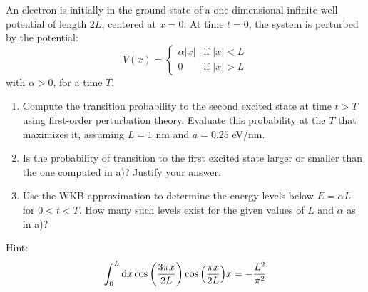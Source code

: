 \begin{esercizio}
   An electron is initially in the ground state of a one-dimensional infinite-well potential of length $2L$, centered at $x = 0$. At time $t = 0$, the system is perturbed by the potential:
   \begin{equation*}
      V(x) =
      \begin{cases}
         \alpha |x| & \text{if } |x| < L\\
         0 & \text{if } |x| > L
      \end{cases}
   \end{equation*}
   with $\alpha > 0$, for a time $T$.
   \begin{enumerate}[label=\alph*), leftmargin=0.6cm]
      \item Compute the transition probability to the second excited state at time $t>T$ using first-order perturbation theory. Evaluate this probability at the $T$ that maximizes it, assuming $L=1$ nm and $a=0.25$ eV/nm.
      \item Is the probability of transition to the first excited state larger or smaller than the one computed in a)? Justify your answer.
      \item Use the WKB approximation to determine the energy levels below $E=\alpha L$ for $0<t<T$. How many such levels exist for the given values of $L$ and $\alpha$ as in a)?
   \end{enumerate}
   Hint:
   \begin{equation*}
      \int_{0}^{L} \dd{x} \cos{ \qty( \frac{3 \pi x}{2 L} ) } \cos{ \qty( \frac{\pi x}{2 L} ) } x
      =-\frac{L^2}{\pi^2}
   \end{equation*}
\end{esercizio}
